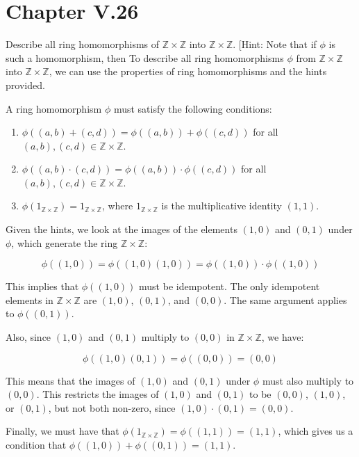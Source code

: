 \documentclass[12pt]{amsart}
\theoremstyle{definition}
\numberwithin{equation}{section}
\theoremstyle{plain}
\newcommand{\Z}{\mathbb{Z}}
\begin{document}
\section*{Chapter V.26}
\begin{exercise}{1} Describe all ring homomorphisms of $\Z \times \Z$ into $\Z \times \Z$. [Hint: Note that if $\phi$ is such a homomorphism, then
    To describe all ring homomorphisms \(\phi\) from \(\mathbb{Z} \times \mathbb{Z}\) into \(\mathbb{Z} \times \mathbb{Z}\), we can use the properties of ring homomorphisms and the hints provided.

A ring homomorphism \(\phi\) must satisfy the following conditions:

\begin{enumerate}
    \item \(\phi((a, b) + (c, d)) = \phi((a, b)) + \phi((c, d))\) for all \((a, b), (c, d) \in \mathbb{Z} \times \mathbb{Z}\).
    \item \(\phi((a, b) \cdot (c, d)) = \phi((a, b)) \cdot \phi((c, d))\) for all \((a, b), (c, d) \in \mathbb{Z} \times \mathbb{Z}\).
    \item \(\phi(1_{\mathbb{Z} \times \mathbb{Z}}) = 1_{\mathbb{Z} \times \mathbb{Z}}\), where \(1_{\mathbb{Z} \times \mathbb{Z}}\) is the multiplicative identity \((1, 1)\).
\end{enumerate}

Given the hints, we look at the images of the elements \((1, 0)\) and \((0, 1)\) under \(\phi\), which generate the ring \(\mathbb{Z} \times \mathbb{Z}\):

\[
\phi((1, 0)) = \phi((1, 0)(1, 0)) = \phi((1, 0))\cdot\phi((1, 0))
\]

This implies that \(\phi((1, 0))\) must be idempotent. The only idempotent elements in \(\mathbb{Z} \times \mathbb{Z}\) are \((1, 0)\), \((0, 1)\), and \((0, 0)\). The same argument applies to \(\phi((0, 1))\).

Also, since \((1, 0)\) and \((0, 1)\) multiply to \((0, 0)\) in \(\mathbb{Z} \times \mathbb{Z}\), we have:

\[
\phi((1, 0)(0, 1)) = \phi((0, 0)) = (0, 0)
\]

This means that the images of \((1, 0)\) and \((0, 1)\) under \(\phi\) must also multiply to \((0, 0)\). This restricts the images of \((1, 0)\) and \((0, 1)\) to be \((0, 0)\), \((1, 0)\), or \((0, 1)\), but not both non-zero, since \((1, 0) \cdot (0, 1) = (0, 0)\).

Finally, we must have that \(\phi(1_{\mathbb{Z} \times \mathbb{Z}}) = \phi((1, 1)) = (1, 1)\), which gives us a condition that \(\phi((1, 0)) + \phi((0, 1)) = (1, 1)\).


\end{exercise}
\end{document}
